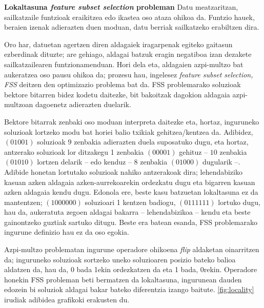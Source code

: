 \documentclass[eu]{ifirak}\usepackage[]{graphicx}\usepackage[]{color}
\begin{document}
\begin{tcolorbox}
\begin{ifexample}{\bf Lokaltasuna \textit{feature subset selection} probleman}
Datu meatzaritzan, sailkatzaile funtzioak eraikitzea edo ikastea oso ataza ohikoa da. Funtzio hauek, beraien izenak adierazten duen moduan, datu berriak sailkatzeko erabiltzen dira. 

Oro har, datuetan agertzen diren aldagaiek iragarpenak egiteko gaitasun ezberdinak dituzte; are gehiago, aldagai batzuk eragin negatiboa izan dezakete sailkatzailearen funtzionamenduan. Hori dela eta, aldagaien azpi-multzo bat aukeratzea oso pausu ohikoa da; prozesu hau, ingelesez {\em feature subset selection, FSS} deitzen den optimizazio problema bat da. FSS problemarako soluzioak bektore bitarren bidez kodetu daitezke, bit bakoitzak dagokion aldagaia azpi-multzoan dagoenetz adierazten duelarik. 

Bektore bitarrak zenbaki oso moduan interpreta daitezke eta, hortaz, inguruneko soluzioak lortzeko modu bat horiei balio txikiak gehitzea/kentzea da. Adibidez, $(01001)$ soluzioak $9$ zenbakia adierazten duela suposatuko dugu, eta hortaz, antzerako soluzioak lor ditzakegu 1 zenbakia $(00001)$ gehituz -- $10$ zenbakia $(01010)$ lortzen delarik -- edo kenduz -- $8$ zenbakia $(01000)$ dugularik --. Adibide honetan lortutako soluzioak nahiko antzerakoak dira; lehendabiziko kasuan azken aldagaia azken-aurrekoarekin ordezkatu dugu eta bigarren kasuan azken aldagaia kendu dugu. Edonola ere, beste kasu batzuetan lokaltasuna ez da mantentzen; $(1000000)$ soluzioari 1 kentzen badiogu, $(0111111)$ lortuko dugu, hau da, aukeratuta zegoen aldagai bakarra -- lehendabizikoa -- kendu eta beste gainontzeko guztiak sartuko ditugu. Beste era batean esanda, FSS problemarako ingurune definizio hau ez da oso egokia.

Azpi-multzo problematan ingurune operadore ohikoena {\em flip} aldaketan oinarritzen da; inguruneko soluzioak sortzeko uneko soluzioaren posizio bateko balioa aldatzen da, hau da, 0 bada 1ekin ordezkatzen da eta 1 bada, 0rekin. Operadore honekin FSS probleman beti bermatzen da lokaltasuna, ingurunean dauden edozein bi soluziok aldagai bakar bateko diferentzia izango baitute. \ref{fig:locality} irudiak adibidea grafikoki erakusten du.
\end{ifexample}
\end{tcolorbox}
\end{document}
